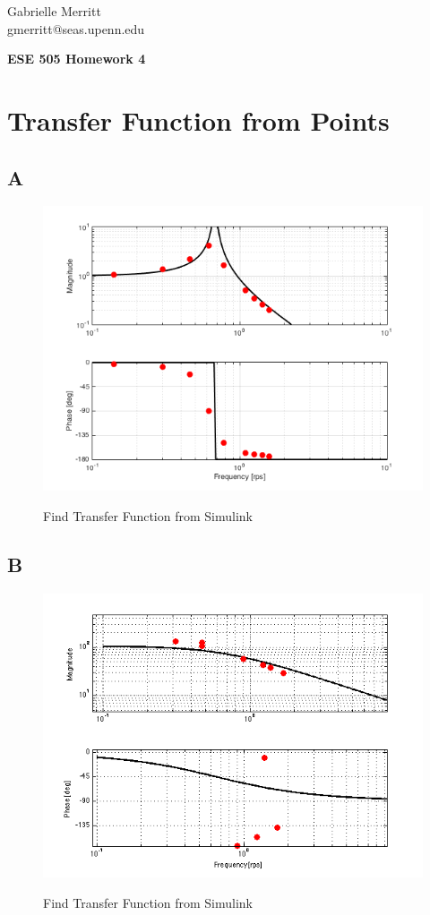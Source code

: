 \documentclass[english]{article}
\begin{document}
Gabrielle Merritt 
\\
gmerritt@seas.upenn.edu 
\begin{center}
{\textbf{ESE 505 Homework 4}} \\
\end{center}
\section*{Transfer Function from Points}
\subsection*{A}
\begin{figure}[!ht]
\includegraphics[width = \linewidth]{frqA.png}
\label{fig:1_a}
\caption{Find Transfer Function from Simulink}
\end{figure}
\subsection*{B}
\begin{figure}[!ht]
\includegraphics[width = \linewidth]{frqB.png}
\label{fig:1_a}
\caption{Find Transfer Function from Simulink}
\end{figure}
\FloatBarrier
\end{document}

